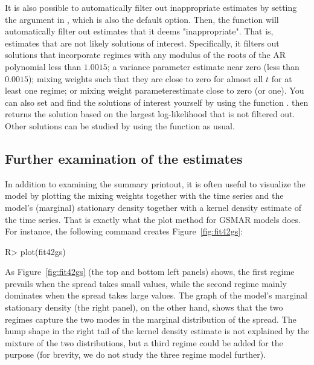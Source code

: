 \documentclass[nojss]{jss} %
\begin{document}
It is also possible to automatically filter out inappropriate estimates by setting the argument  in , which is also the default option. Then, the function will automatically filter out estimates that it deems "inappropriate".  That is, estimates that are not likely solutions of interest. Specifically, it filters out solutions that incorporate regimes with any modulus of the roots of the AR polynomial less than $1.0015$; a variance parameter estimate near zero  (less than $0.0015$); mixing weights such that they are close to zero for almost all $t$ for at least one regime; or mixing weight parameterestimate close to zero (or one). You can also set  and find the solutions of interest yourself by using the function .  then returns the solution based on the largest log-likelihood that is not filtered out. Other solutions can be studied by using the function  as usual.


\subsection{Further examination of the estimates}\label{sec:examestim}

In addition to examining the summary printout, it is often useful to visualize the model by plotting the mixing weights together with the time series and the model's (marginal) stationary density together with a kernel density estimate of the time series. That is exactly what the plot method for GSMAR models does. For instance, the following command creates Figure~\ref{fig:fit42gs}:
%
\begin{CodeChunk}
\begin{CodeInput}
R> plot(fit42gs)
\end{CodeInput}
\end{CodeChunk}
%
As Figure~\ref{fig:fit42gs} (the top and bottom left panels) shows, the first regime prevails when the spread takes small values, while the second regime mainly dominates when the spread takes large values. The graph of the model's marginal stationary density (the right panel), on the other hand, shows that the two regimes capture the two modes in the marginal distribution of the spread. The hump shape in the right tail of the kernel density estimate is not explained by the mixture of the two distributions, but a third regime could be added for the purpose (for brevity, we do not study the three regime model further).
\end{document}
